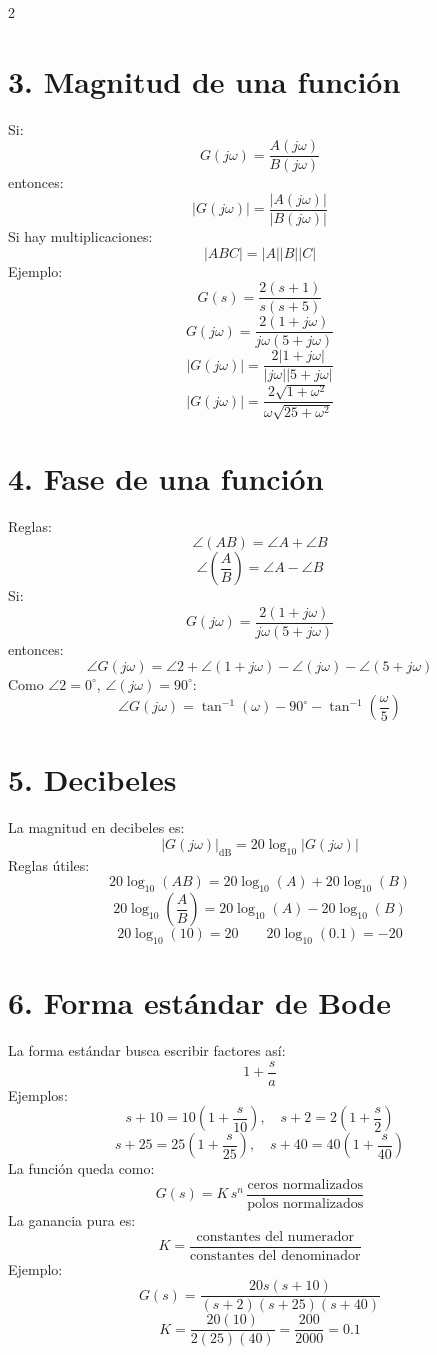 \documentclass[11pt]{article}
\begin{document}
\begin{multicols}{2}
\section*{3. Magnitud de una función}

Si:
\[
G(j\omega)=\frac{A(j\omega)}{B(j\omega)}
\]
entonces:
\[
|G(j\omega)|=\frac{|A(j\omega)|}{|B(j\omega)|}
\]
Si hay multiplicaciones:
\[
|ABC|=|A||B||C|
\]
Ejemplo:
\[
G(s)=\frac{2(s+1)}{s(s+5)}
\]
\[
G(j\omega)=\frac{2(1+j\omega)}{j\omega(5+j\omega)}
\]
\[
|G(j\omega)|=\frac{2|1+j\omega|}{|j\omega||5+j\omega|}
\]
\[
|G(j\omega)|=\frac{2\sqrt{1+\omega^2}}{\omega\sqrt{25+\omega^2}}
\]

\section*{4. Fase de una función}

Reglas:
\[
\angle(AB)=\angle A+\angle B
\]
\[
\angle\!\left(\frac{A}{B}\right)=\angle A-\angle B
\]
Si:
\[
G(j\omega)=\frac{2(1+j\omega)}{j\omega(5+j\omega)}
\]
entonces:
\[
\angle G(j\omega)=\angle 2+\angle(1+j\omega)-\angle(j\omega)-\angle(5+j\omega)
\]
Como $\angle 2=0^\circ$, $\angle(j\omega)=90^\circ$:
\[
\angle G(j\omega)=\tan^{-1}(\omega)-90^\circ-\tan^{-1}\!\left(\frac{\omega}{5}\right)
\]

\section*{5. Decibeles}

La magnitud en decibeles es:
\[
|G(j\omega)|_{\mathrm{dB}}=20\log_{10}|G(j\omega)|
\]
Reglas útiles:
\[
20\log_{10}(AB)=20\log_{10}(A)+20\log_{10}(B)
\]
\[
20\log_{10}\!\left(\frac{A}{B}\right)=20\log_{10}(A)-20\log_{10}(B)
\]
\[
20\log_{10}(10)=20 \qquad 20\log_{10}(0.1)=-20
\]

\section*{6. Forma estándar de Bode}

La forma estándar busca escribir factores así:
\[
1+\frac{s}{a}
\]
Ejemplos:
\[
s+10=10\!\left(1+\frac{s}{10}\right), \quad s+2=2\!\left(1+\frac{s}{2}\right)
\]
\[
s+25=25\!\left(1+\frac{s}{25}\right), \quad s+40=40\!\left(1+\frac{s}{40}\right)
\]
La función queda como:
\[
G(s)=K\,s^n\,\frac{\text{ceros normalizados}}{\text{polos normalizados}}
\]
La ganancia pura es:
\[
K=\frac{\text{constantes del numerador}}{\text{constantes del denominador}}
\]
Ejemplo:
\[
G(s)=\frac{20s(s+10)}{(s+2)(s+25)(s+40)}
\]
\[
K=\frac{20(10)}{2(25)(40)}=\frac{200}{2000}=0.1
\]


\end{multicols}
\end{document}
